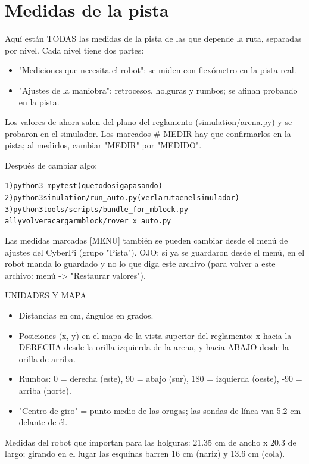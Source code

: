 \section{Medidas de la pista}\label{sec:pista}
Aquí están TODAS las medidas de la pista de las que depende la ruta, separadas por nivel. Cada nivel tiene dos partes:

\begin{itemize}\setlength\itemsep{0pt}
\item "Mediciones que necesita el robot": se miden con flexómetro en la pista real.
\item "Ajustes de la maniobra": retrocesos, holguras y rumbos; se afinan probando en la pista.
\end{itemize}
Los valores de ahora salen del plano del reglamento (simulation/arena.py) y se probaron en el simulador. Los marcados  \# MEDIR  hay que confirmarlos en la pista; al medirlos, cambiar "MEDIR" por "MEDIDO".

Después de cambiar algo:

{\small\begin{alltt}
1) python3 -m pytest              (que todo siga pasando)
2) python3 simulation/run\_auto.py (ver la ruta en el simulador)
3) python3 tools/scripts/bundle\_for\_mblock.py --all   y volver a cargar mblock/rover\_x\_auto.py
\end{alltt}}
Las medidas marcadas [MENU] también se pueden cambiar desde el menú de ajustes del CyberPi (grupo "Pista"). OJO: si ya se guardaron desde el menú, en el robot manda lo guardado y no lo que diga este archivo (para volver a este archivo: menú -> "Restaurar valores").

UNIDADES Y MAPA

\begin{itemize}\setlength\itemsep{0pt}
\item Distancias en cm, ángulos en grados.
\item Posiciones (x, y) en el mapa de la vista superior del reglamento: x hacia la DERECHA desde la orilla izquierda de la arena, y hacia ABAJO desde la orilla de arriba.
\item Rumbos: 0 = derecha (este), 90 = abajo (sur), 180 = izquierda (oeste), -90 = arriba (norte).
\item "Centro de giro" = punto medio de las orugas; las sondas de línea van 5.2 cm delante de él.
\end{itemize}
Medidas del robot que importan para las holguras: 21.35 cm de ancho x 20.3 de largo; girando en el lugar las esquinas barren 16 cm (nariz) y 13.6 cm (cola).

